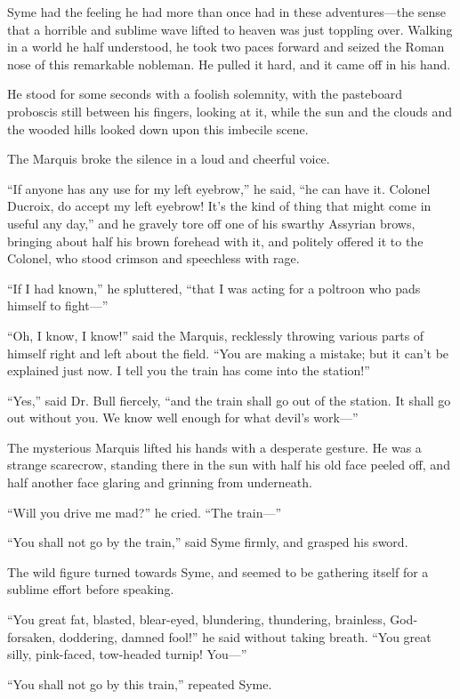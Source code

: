 \documentclass{book}
\begin{document}
Syme had the feeling he had more than once had in these adventures—the sense that a horrible and sublime wave lifted to heaven was just toppling over. Walking in a world he half understood, he took two paces forward and seized the Roman nose of this remarkable nobleman. He pulled it hard, and it came off in his hand.

He stood for some seconds with a foolish solemnity, with the pasteboard proboscis still between his fingers, looking at it, while the sun and the clouds and the wooded hills looked down upon this imbecile scene.

The Marquis broke the silence in a loud and cheerful voice.

“If anyone has any use for my left eyebrow,” he said, “he can have it. Colonel Ducroix, do accept my left eyebrow! It’s the kind of thing that might come in useful any day,” and he gravely tore off one of his swarthy Assyrian brows, bringing about half his brown forehead with it, and politely offered it to the Colonel, who stood crimson and speechless with rage.

“If I had known,” he spluttered, “that I was acting for a poltroon who pads himself to fight—”

“Oh, I know, I know!” said the Marquis, recklessly throwing various parts of himself right and left about the field. “You are making a mistake; but it can’t be explained just now. I tell you the train has come into the station!”

“Yes,” said Dr. Bull fiercely, “and the train shall go out of the station. It shall go out without you. We know well enough for what devil’s work—”

The mysterious Marquis lifted his hands with a desperate gesture. He was a strange scarecrow, standing there in the sun with half his old face peeled off, and half another face glaring and grinning from underneath.

“Will you drive me mad?” he cried. “The train—”

“You shall not go by the train,” said Syme firmly, and grasped his sword.

The wild figure turned towards Syme, and seemed to be gathering itself for a sublime effort before speaking.

“You great fat, blasted, blear-eyed, blundering, thundering, brainless, God-forsaken, doddering, damned fool!” he said without taking breath. “You great silly, pink-faced, tow-headed turnip! You—”

“You shall not go by this train,” repeated Syme.
\end{document}
